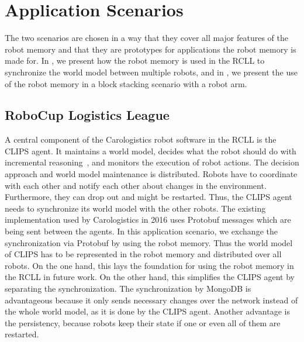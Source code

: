 \section{Application Scenarios}
\label{sec:applicationscenarios}
The two scenarios are chosen in a way that they
cover all major features of the robot memory and that they are
prototypes for applications the robot memory is made for.
In , we present how the robot memory is used in
the RCLL to synchronize the world model between multiple robots, and in
, we present the use of the robot memory
in a block stacking scenario with a robot arm.

\subsection{RoboCup Logistics League}
\label{sec:app-rcll}
A central component of
the Carologistics robot software in the RCLL is the CLIPS agent. It
maintains a world model, decides what the robot should do with
incremental reasoning~\cite{CLIPS-Agent}, and monitors the execution
of robot actions. The decision approach and world model maintenance is
distributed. Robots have to coordinate with each other and notify each
other about changes in the environment. Furthermore, they can drop out
and might be restarted. Thus, the CLIPS agent needs to synchronize its
world model with the other robots. The existing implementation used by
Carologistics in 2016 uses Protobuf messages which are being sent
between the agents. In this application scenario, we exchange the
synchronization via Protobuf by using the robot memory. Thus the world
model of CLIPS has to be represented in the robot memory and
distributed over all robots. On the one hand, this lays the foundation
for using the robot memory in the RCLL in future work. On the other
hand, this simplifies the CLIPS agent by separating the
synchronization. The synchronization by MongoDB is advantageous
because it only sends necessary changes over the network instead of
the whole world model, as it is done by the CLIPS agent. Another
advantage is the persistency, because robots keep their state if one
or even all of them are restarted.

